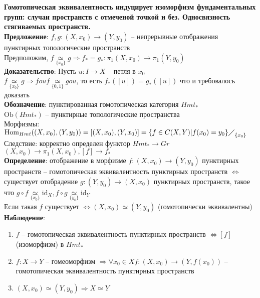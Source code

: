 \section{} 
	\textbf{Гомотопическая эквивалентность индуцирует изоморфизм фундаментальных групп: случаи пространств с отмеченой точкой и без. Односвязность стягиваемых пространств.}\\
	\textbf{Предложение}: $f,g: (X, x_0) \rightarrow (Y, y_0)$ -- непрерывные отображения пунктирных топологические пространств\\
	Предположим, $f \underset{\{x_0\}}{\simeq} g \Rightarrow f_* = g_*: {\pi}_1 (X,x_0) \rightarrow {\pi}_1 (Y, y_0)$\\
	\textbf{Доказательство}: Пусть $u: I \rightarrow X$ -- петля в $x_0$\\
	$f \underset{\{x_0\}}{\simeq} g \Rightarrow fou f \underset{\{0,1\}}{\simeq} gou$, то есть $f_* ([u]) = g_* ([u])$ что и требовалось доказать\\
	\textbf{Обозначение}: пунктированная гомотопическая категория $Hmt_*$\\
	$\text{Ob}(Hmt_*)$ -- пунктирные топологические пространства\\
	Морфизмы: $\text{Hom}_{Hmt} ((X, x_0), (Y,y_0)) = [(X,x_0),(Y,x_0)] = {\{f\in C(X,Y) | f(x_0) = y_0\} \diagup}_{\{x_0\}}$\\
	Следствие: корректно определен функтор $Hmt_* \rightarrow Gr$\\
	$(X,x_0) \rightarrow {\pi}_1 (X,x_0), [f] \rightarrow f_*$\\
	\textbf{Определение}: отображение в морфизме $f: (X,x_0) \rightarrow (Y,y_0)$ пунктирных пространств -- гомотопическая эквивалентность пунктирных пространств $\Leftrightarrow$ существует отобрадение $g: (Y, y_0) \rightarrow (X,x_0)$ пунктирных пространств, такое что $g \circ f \underset{\{x_0\}}{\simeq}  \text{id}_X, f \circ g \underset{\{y_0\}}{\simeq}  \text{id}_Y$\\
	Если такая $f$ существует $\Leftrightarrow (X,x_0) \simeq (Y,y_0)$ (гомотопически эквивалентны)\\
	\textbf{Наблюдение}:
	\begin{enumerate}
	\item $f$ -- гомотопическая эквивалентность пунктирных пространств $\Leftrightarrow [f]$ (изоморфизм) в $Hmt_*$
	\item $f: X\rightarrow Y$ -- гомеоморфизм $\Rightarrow \forall x_0 \in X f: (X,x_0) \rightarrow (Y, f(x_0))$ -- гомотопическая эквивалентность пунктирных пространств
	\item $(X, x_0) \simeq (Y,y_0) \Rightarrow X\simeq Y$
	\end{enumerate}
